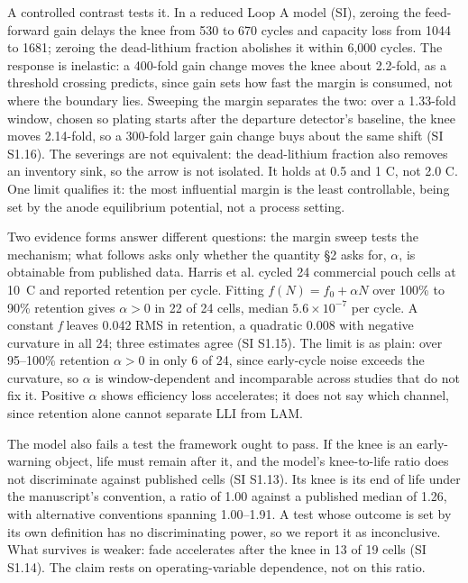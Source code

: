\documentclass[AMA,Times2COL]{WileyNJDv5}
\begin{document}
A controlled contrast tests it. In a reduced Loop A model (SI), zeroing the feed-forward gain delays the knee from 530 to 670 cycles and capacity loss from 1044 to 1681; zeroing the dead-lithium fraction abolishes it within 6,000 cycles. The response is inelastic: a 400-fold gain change moves the knee about 2.2-fold, as a threshold crossing predicts, since gain sets how fast the margin is consumed, not where the boundary lies. Sweeping the margin separates the two: over a 1.33-fold window, chosen so plating starts after the departure detector's baseline, the knee moves 2.14-fold, so a 300-fold larger gain change buys about the same shift (SI S1.16). The severings are not equivalent: the dead-lithium fraction also removes an inventory sink, so the arrow is not isolated. It holds at 0.5 and 1 C, not 2.0 C. One limit qualifies it: the most influential margin is the least controllable, being set by the anode equilibrium potential, not a process setting.

Two evidence forms answer different questions: the margin sweep tests the mechanism; what follows asks only whether the quantity \S2 asks for, $\alpha$, is obtainable from published data. Harris et al. cycled 24 commercial pouch cells at 10 C and reported retention per cycle.\cite{harris2017failure} Fitting $f(N) = f_0 + \alpha N$ over 100\% to 90\% retention gives $\alpha > 0$ in 22 of 24 cells, median $5.6\times10^{-7}$ per cycle. A constant \emph{f} leaves 0.042 RMS in retention, a quadratic 0.008 with negative curvature in all 24; three estimates agree (SI S1.15). The limit is as plain: over 95--100\% retention $\alpha > 0$ in only 6 of 24, since early-cycle noise exceeds the curvature, so $\alpha$ is window-dependent and incomparable across studies that do not fix it. Positive $\alpha$ shows efficiency loss accelerates; it does not say which channel, since retention alone cannot separate LLI from LAM.

The model also fails a test the framework ought to pass. If the knee is an early-warning object, life must remain after it, and the model's knee-to-life ratio does not discriminate against published cells (SI S1.13). Its knee is its end of life under the manuscript's convention, a ratio of 1.00 against a published median of 1.26, with alternative conventions spanning 1.00--1.91. A test whose outcome is set by its own definition has no discriminating power, so we report it as inconclusive. What survives is weaker: fade accelerates after the knee in 13 of 19 cells (SI S1.14). The claim rests on operating-variable dependence, not on this ratio.
\end{document}
